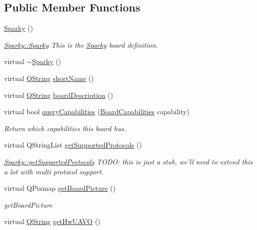 \subsection*{Public Member Functions}
\begin{DoxyCompactItemize}
\item 
\hyperlink{group___boards___tau_labs_plugin_ga81d45abeade9a73a7d354c71e826e906}{Sparky} ()
\begin{DoxyCompactList}\small\item\em \hyperlink{group___boards___tau_labs_plugin_ga81d45abeade9a73a7d354c71e826e906}{Sparky\-::\-Sparky} This is the \hyperlink{class_sparky}{Sparky} board definition. \end{DoxyCompactList}\item 
virtual \hyperlink{group___boards___tau_labs_plugin_gafad187a9e7207b7b14ca0c71eaa7ad48}{$\sim$\-Sparky} ()
\item 
virtual \hyperlink{group___u_a_v_objects_plugin_gab9d252f49c333c94a72f97ce3105a32d}{Q\-String} \hyperlink{group___boards___tau_labs_plugin_gac9c737083d657f5a125688683f1adf88}{short\-Name} ()
\item 
virtual \hyperlink{group___u_a_v_objects_plugin_gab9d252f49c333c94a72f97ce3105a32d}{Q\-String} \hyperlink{group___boards___tau_labs_plugin_gad8873cb94f7f63588e8e88b20d511d76}{board\-Description} ()
\item 
virtual bool \hyperlink{group___boards___tau_labs_plugin_ga4b25de756ae522bc8ec649c4885a4e91}{query\-Capabilities} (\hyperlink{group___core_plugin_ga01b09218f2a13aaeee6db007ac6bd967}{Board\-Capabilities} capability)
\begin{DoxyCompactList}\small\item\em Return which capabilities this board has. \end{DoxyCompactList}\item 
virtual Q\-String\-List \hyperlink{group___boards___tau_labs_plugin_gae2df29177bbd9a5f916f60eeb6be284c}{get\-Supported\-Protocols} ()
\begin{DoxyCompactList}\small\item\em \hyperlink{group___boards___tau_labs_plugin_gae2df29177bbd9a5f916f60eeb6be284c}{Sparky\-::get\-Supported\-Protocols} T\-O\-D\-O\-: this is just a stub, we'll need to extend this a lot with multi protocol support. \end{DoxyCompactList}\item 
virtual Q\-Pixmap \hyperlink{group___boards___tau_labs_plugin_ga53e085a977e64c71dde6c29926cfa568}{get\-Board\-Picture} ()
\begin{DoxyCompactList}\small\item\em get\-Board\-Picture \end{DoxyCompactList}\item 
virtual \hyperlink{group___u_a_v_objects_plugin_gab9d252f49c333c94a72f97ce3105a32d}{Q\-String} \hyperlink{group___boards___tau_labs_plugin_ga20cbe067bab385a37bea66e2f97d8d7a}{get\-Hw\-U\-A\-V\-O} ()
\end{DoxyCompactItemize}
